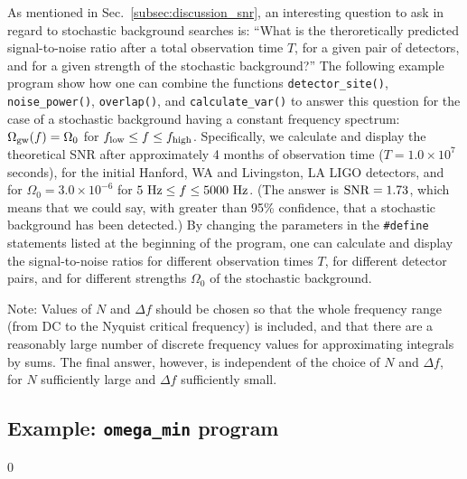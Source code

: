 As mentioned in Sec.~\ref{subsec:discussion_snr}, an interesting
question to ask in regard to stochastic background searches is:
``What is the theroretically predicted signal-to-noise ratio after a total
observation time $T$, for a given pair of detectors, and for a given
strength of the stochastic background?''
The following example program show how one can combine the functions
{\tt detector\_site()}, {\tt noise\_power()}, {\tt overlap()}, and
{\tt calculate\_var()} to answer this question for the case of a 
stochastic background having a constant frequency spectrum:
$\Omega_{\rm gw}(f)=\Omega_0$ for $f_{\rm low}\le f\le f_{\rm high}$.
Specifically, we calculate and display the theoretical SNR after 
approximately 4 months of observation time ($T=1.0\times 10^7$ seconds), 
for the initial Hanford, WA and Livingston, LA LIGO detectors, and for 
$\Omega_0=3.0\times 10^{-6}$ for $5\ {\rm Hz}\le f\le 5000\ {\rm Hz}$.
(The answer is ${\rm SNR}=1.73$, which means that we could say, with greater 
than 95\% confidence, that a stochastic background has been detected.)
By changing the parameters in the {\tt \#define} statements listed
at the beginning of the program, one can calculate and display the 
signal-to-noise ratios for different observation times $T$, for different 
detector pairs, and for different strengths $\Omega_0$ of the stochastic 
background.

Note: Values of $N$ and $\Delta f$ should be chosen so that the whole
frequency range (from DC to the Nyquist critical frequency) is included,
and that there are a reasonably large number of discrete frequency values
for approximating integrals by sums.
The final answer, however, is independent of the choice of $N$ and 
$\Delta f$, for $N$ sufficiently large and $\Delta f$ sufficiently small.


\clearpage

\subsection{Example: {\tt omega\_min} program}
\label{subsec:example_omega_min}
\setcounter{equation}0

